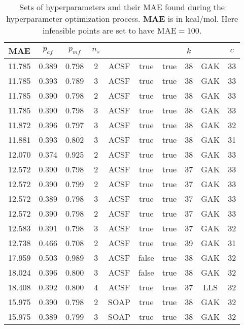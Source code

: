 \documentclass[12pt]{article}
\begin{document}
\begin{table}[H]
	\centering
	\caption{Sets of hyperparameters and their MAE found during the hyperparameter optimization process. \textbf{MAE} is in kcal/mol. Here infeasible points are set to have $\text{MAE} = 100$.} 
	\begin{tabular}{|c|c|c|c|c|c|c|c|c|c|}
		\hline
		\textbf{MAE}	& $p_{af}$ & $p_{mf}$ & $n_s$ & \codeword{ftype} & \codeword{norm_af} & \codeword{norm_mf} & $k$ & \codeword{model} & $c$	\\ \hline
		11.785	& 0.389	& 0.798	& 2	& ACSF	& true	& true	& 38	& GAK	& 33	\\ \hline
		11.785	& 0.393	& 0.789	& 3	& ACSF	& true	& true	& 38	& GAK	& 33	\\ \hline
		11.785	& 0.390	& 0.798	& 2	& ACSF	& true	& true	& 38	& GAK	& 33	\\ \hline
		11.785	& 0.390	& 0.798	& 3	& ACSF	& true	& true	& 38	& GAK	& 33	\\ \hline
		11.872	& 0.396	& 0.797	& 3	& ACSF	& true	& true	& 38	& GAK	& 32	\\ \hline
		11.881	& 0.393	& 0.802	& 3	& ACSF	& true	& true	& 38	& GAK	& 31	\\ \hline
		12.070	& 0.374	& 0.925	& 2	& ACSF	& true	& true	& 38	& GAK	& 33	\\ \hline
		12.572	& 0.390	& 0.798	& 2	& ACSF	& true	& true	& 37	& GAK	& 33	\\ \hline
		12.572	& 0.390	& 0.799	& 2	& ACSF	& true	& true	& 37	& GAK	& 33	\\ \hline
		12.572	& 0.389	& 0.798	& 3	& ACSF	& true	& true	& 37	& GAK	& 33	\\ \hline
		12.572	& 0.390	& 0.798	& 2	& ACSF	& true	& true	& 37	& GAK	& 33	\\ \hline
		12.583	& 0.391	& 0.798	& 3	& ACSF	& true	& true	& 37	& GAK	& 32	\\ \hline
		12.738	& 0.466	& 0.708	& 2	& ACSF	& true	& true	& 39	& GAK	& 31	\\ \hline
		17.959	& 0.503	& 0.989	& 3	& ACSF	& false	& true	& 38	& GAK	& 32	\\ \hline
		18.024	& 0.396	& 0.800	& 3	& ACSF	& false	& true	& 38	& GAK	& 32	\\ \hline
		18.408	& 0.392	& 0.800	& 4	& ACSF	& true	& true	& 37	& LLS	& 32	\\ \hline
		15.975	& 0.390	& 0.798	& 2	& SOAP	& true	& true	& 38	& GAK	& 32	\\ \hline
		15.975	& 0.389	& 0.799	& 3	& SOAP	& true	& true	& 38	& GAK	& 32	\\ \hline

\end{tabular}
\end{table}
\end{document}
